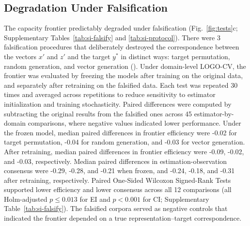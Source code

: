 \documentclass{article}
\begin{document}
\subsection*{Degradation Under Falsification}
\label{sub-sec:falsify}
The capacity frontier predictably degraded under falsification (Fig.~\ref{fig:tests}c; Supplementary Tables~\ref{tab:si-falsify} and \ref{tab:si-protocol}). There were 3 falsification procedures that deliberately destroyed the correspondence between the vectors $x'$ and $z'$ and the target $y^*$ in distinct ways: target permutation, random generation, and vector generation (). Under domain-level LOGO-CV, the frontier was evaluated by freezing the models after training on the original data, and separately after retraining on the falsified data. Each test was repeated 30 times and averaged across repetitions to reduce sensitivity to estimator initialization and training stochasticity. Paired differences were computed by subtracting the original results from the falsified ones across 45 estimator-by-domain comparisons, where negative values indicated lower performance. Under the frozen model, median paired differences in frontier efficiency were -0.02 for target permutation, -0.04 for random generation, and -0.03 for vector generation. After retraining, median paired differences in frontier efficiency were -0.09, -0.02, and -0.03, respectively. Median paired differences in estimation-observation consensus were -0.29, -0.28, and -0.21 when frozen, and -0.24, -0.18, and -0.31 after retraining, respectively. Paired One-Sided Wilcoxon Signed-Rank Tests supported lower efficiency and lower consensus across all 12 comparisons (all Holm-adjusted $p \le 0.013$ for EI and $p < 0.001$ for CI; Supplementary Table~\ref{tab:si-falsify}). The falsified corpora served as negative controls that indicated the frontier depended on a true representation–target correspondence.
\end{document}
